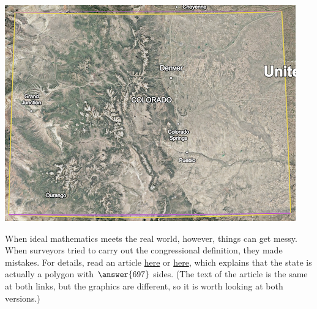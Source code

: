 \documentclass{ximera}
\begin{document}
\begin{problem}
\begin{problem}
\begin{problem}
\begin{center}
\includegraphics[scale=0.5]{colorado.png}
\end{center}

When ideal mathematics meets the real world, however, things can get messy.  When surveyors tried to carry out the congressional definition, they made mistakes.  For details, read an article \href{https://www.atlasobscura.com/articles/is-colorado-a-rectangle}{here} or \href{https://bigthink.com/strange-maps/colorado-is-not-a-rectangle/}{here}, which explains that the state is actually a polygon with $\answer{697}$ sides.  (The text of the article is the same at both links, but the graphics are different, so it is worth looking at both versions.) 



\end{problem}
\end{problem}
\end{problem}
\end{document}
